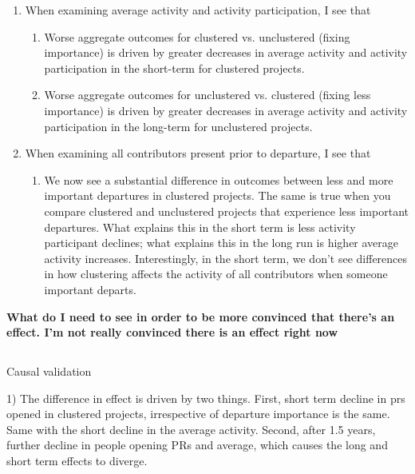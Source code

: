\begin{enumerate}
\begin{enumerate}
        \end{enumerate}
    \item When examining average activity and activity participation, I see that
    \begin{enumerate}
        \item Worse aggregate outcomes for clustered vs. unclustered (fixing importance) is driven by greater decreases in average activity and activity participation in the short-term for clustered projects. 
        \item Worse aggregate outcomes for unclustered vs. clustered (fixing less importance) is driven by greater decreases in average activity and activity participation in the long-term for unclustered projects. 
    \end{enumerate}
    \item When examining all contributors present prior to departure, I see that
    \begin{enumerate}
        \item We now see a substantial difference in outcomes between less and more important departures in clustered projects. The same is true when you compare clustered and unclustered projects that experience less important departures. What explains this in the short term is less activity participant declines; what explains this in the long run is higher average activity increases. Interestingly, in the short term, we don't see differences in how clustering affects the activity of all contributors when someone important departs. 
    \end{enumerate}
\end{enumerate}
\textbf{What do I need to see in order to be more convinced that there's an effect. I'm not really convinced there is an effect right now}


\subsection{}
Causal validation 


1) The difference in effect is driven by two things. First, short term decline in prs opened in clustered projects, irrespective of departure importance is the same. Same with the short decline in the average activity. Second, after 1.5 years, further decline in people opening PRs and average, which causes the long and short term effects to diverge. 

